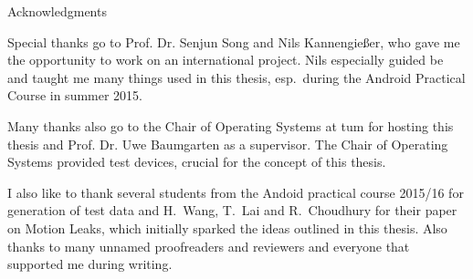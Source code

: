 \thispagestyle{empty}

\vspace*{2cm}

\begin{center}
{ Acknowledgments}
\end{center}

\vspace{1cm}

Special thanks go to Prof. Dr. Senjun Song and Nils Kannengießer, who gave me the opportunity to work on an international project. Nils especially guided be and taught me many things used in this thesis, esp.\ during the Android Practical Course in summer 2015.

Many thanks also go to the Chair of Operating Systems at \gls{tum} for hosting this thesis and Prof. Dr. Uwe Baumgarten as a supervisor. The Chair of Operating Systems provided test devices, crucial for the concept of this thesis.

I also like to thank several students from the Andoid practical course 2015/16 for generation of test data and H.\ Wang, T.\ Lai and R.\ Choudhury for their paper on Motion Leaks\cite{wang2015mole}, which initially sparked the ideas outlined in this thesis. Also thanks to many unnamed proofreaders and reviewers and everyone that supported me during writing.

\cleardoublepage{}
